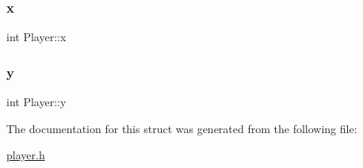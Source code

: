 \mbox{\label{structPlayer_ad285b3cb25e4a46ca944b9a416c1b13f}} 
\subsubsection{\texorpdfstring{x}{x}}
{\footnotesize\ttfamily int Player\+::x}

\mbox{\label{structPlayer_a6da29d6e3783c6028c92647bbde478f5}} 
\subsubsection{\texorpdfstring{y}{y}}
{\footnotesize\ttfamily int Player\+::y}



The documentation for this struct was generated from the following file\+:\begin{DoxyCompactItemize}
\item 
\mbox{\hyperlink{player_8h}{player.\+h}}\end{DoxyCompactItemize}
